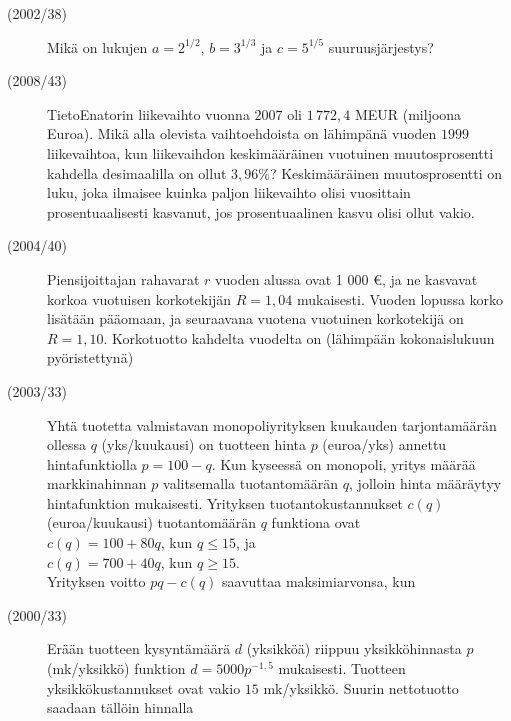 \begin{description}
	\item[(2002/38)] Mikä on lukujen $a=2^{1/2}$, $b=3^{1/3}$ ja $c=5^{1/5}$ suuruusjärjestys?
        


	\item[(2008/43)] TietoEnatorin liikevaihto vuonna $2007$ oli $1\,772{,}4$ MEUR (miljoona Euroa). Mikä
	alla olevista vaihtoehdoista on lähimpänä vuoden $1999$ liikevaihtoa, kun
	liikevaihdon keskimääräinen vuotuinen muutosprosentti kahdella desimaalilla on
	ollut $3{,}96 \%$? Keskimääräinen muutosprosentti on luku, joka ilmaisee kuinka paljon
	liikevaihto olisi vuosittain prosentuaalisesti kasvanut, jos prosentuaalinen kasvu olisi
	ollut vakio.
        


	\item[(2004/40)] Piensijoittajan rahavarat $r$ vuoden alussa ovat 1 000 \euro, ja ne kasvavat korkoa vuotuisen korkotekijän $R=1{,}04$ mukaisesti. Vuoden lopussa korko lisätään pääomaan, ja seuraavana vuotena vuotuinen korkotekijä on $R=1{,}10$. Korkotuotto kahdelta vuodelta on (lähimpään kokonaislukuun pyöristettynä)
        


	\item[(2003/33)] Yhtä tuotetta valmistavan monopoliyrityksen kuukauden tarjontamäärän ollessa $q$ (yks/kuukausi) on tuotteen hinta $p$ (euroa/yks) annettu hintafunktiolla $p = 100-q$. Kun kyseessä on monopoli, yritys määrää markkinahinnan $p$ valitsemalla tuotantomäärän $q$, jolloin hinta määräytyy hintafunktion mukaisesti. Yrityksen tuotantokustannukset $c(q)$ (euroa/kuukausi) tuotantomäärän $q$ funktiona ovat\\
$c(q)=100+80q$, kun $q\leq 15$, ja\\
$c(q)=700+40q$, kun $q\geq 15$.\\
Yrityksen voitto $pq-c(q)$ saavuttaa maksimiarvonsa, kun
        


	\item[(2000/33)] Erään tuotteen kysyntämäärä $d$ (yksikköä) riippuu yksikköhinnasta $p$ (mk/yksikkö) funktion $d=5000p^{-1{,}5}$ mukaisesti. Tuotteen yksikkökustannukset ovat vakio $15$ mk/yksikkö. Suurin nettotuotto saadaan tällöin hinnalla
        

	
\end{description}
